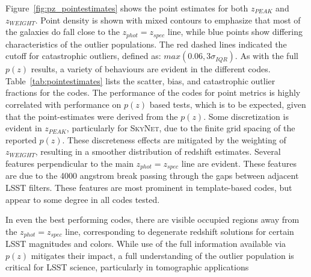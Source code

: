 Figure~\ref{fig:pz_pointestimates} shows the point estimates for both $z_{PEAK}$ and $z_{WEIGHT}$.
Point density is shown with mixed contours to emphasize that most of the galaxies do fall close to the $z_{phot}=z_{spec}$ line, while blue points show differing characteristics of the outlier populations.
The red dashed lines indicated the cutoff for catastrophic outliers, defined as: $max(0.06,3\sigma_{IQR})$.
As with the full $p(z)$ results, a variety of behaviours are evident in the different codes.  Table~\ref{tab:pointestimates} lists the scatter, bias, and catastrophic outlier fractions for the codes.
The performance of the codes for point metrics is highly correlated with performance on $p(z)$ based tests, which is to be expected, given that the point-estimates were derived from the $p(z)$.
Some discretization is evident in $z_{PEAK}$, particularly for \textsc{SkyNet}, due to the finite grid spacing of the reported $p(z)$.
These discreteness effects are mitigated by the weighting of $z_{WEIGHT}$, resulting in a smoother distribution of redshift estimates.
Several features perpendicular to the main $z_{phot}=z_{spec}$ line are evident.
These features are due to the 4000 angstrom break passing through the gaps between adjacent LSST filters.
These features are most prominent in template-based codes, but appear to some degree in all codes tested.

In even the best performing codes, there are visible occupied regions away from the $z_{phot}=z_{spec}$ line, corresponding to degenerate redshift solutions for certain LSST magnitudes and colors.
While use of the full information available via $p(z)$ mitigates their impact, a full understanding of the outlier population is critical for LSST science, particularly in tomographic applications %

